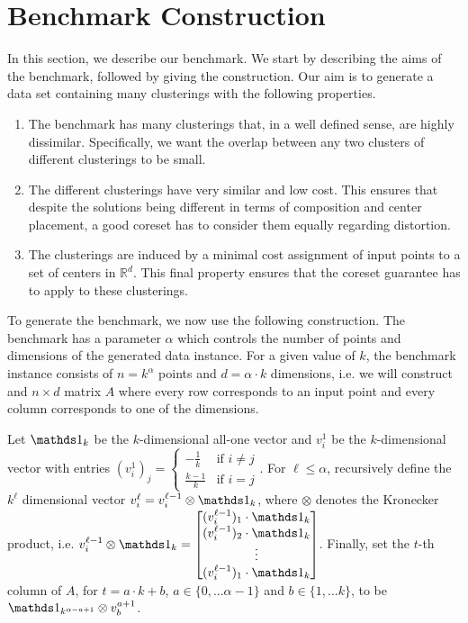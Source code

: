 \section{Benchmark Construction}
\label{sec:benchmark}

In this section, we describe our benchmark. We start by describing the aims of the benchmark, followed by giving the construction. Our aim is to generate a data set containing many clusterings with the following properties. 
\begin{enumerate}
\item The benchmark has many clusterings that, in a well defined sense, are highly dissimilar. Specifically, we want the overlap between any two clusters of different clusterings to be small.
\item The different clusterings have very similar and low cost. This ensures that despite the solutions being different in terms of composition and center placement, a good coreset has to consider them equally regarding distortion.
\item The clusterings are induced by a minimal cost assignment of input points to a set of centers in $\mathbb{R}^d$. This final property ensures that the coreset guarantee has to apply to these clusterings.
\end{enumerate} 


To generate the benchmark, we now use the following construction. The benchmark has a parameter $\alpha$ which controls the number of points and dimensions of the generated data instance.
For a given value of $k$, the benchmark instance consists of $n=k^\alpha$ points and $d=\alpha \cdot k$ dimensions, i.e. we will construct and $n\times d$ matrix $A$ where every row corresponds to an input point and every column corresponds to one of the dimensions.

Let $\one_k$ be the $k$-dimensional all-one vector and $v_i^1$ be the $k$-dimensional vector with entries $(v_i^1)_j = \begin{cases}-\frac{1}{k} & \text{if } i\neq j\\
\frac{k-1}{k} & \text{if } i= j\end{cases}$.
For $\ell\leq \alpha$, recursively define the $k^{\ell}$ dimensional vector $v_i^{\ell} = v_i^{\ell-1}\otimes \one_k $, where $\otimes$ denotes the Kronecker product, i.e. $ v_i^{\ell-1}\otimes \one_k= \begin{bmatrix}
(v_i^{\ell-1})_1 \cdot \one_k \\
(v_i^{\ell-1})_2 \cdot \one_k \\
\vdots \\
(v_i^{\ell-1})_1 \cdot \one_k
\end{bmatrix}$. 
Finally, set the $t$-th column of $A$, for $t = a\cdot k + b$, $a\in \{0,\ldots \alpha-1\}$ and $b \in \{1,\ldots k\}$, to be $\one_{k^{\alpha-a+1}}\otimes v_b^{a+1}$.


